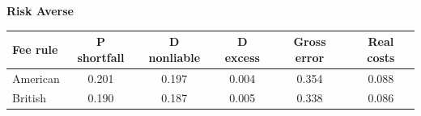\documentclass[10pt,border=5pt,varwidth=17cm]{standalone}
\begin{document}
\begingroup
\small
\setlength{\tabcolsep}{5pt}
\renewcommand{\arraystretch}{1.20}
\noindent\textbf{Risk Averse}\par\smallskip
\noindent\begin{tabularx}{\linewidth}{@{}>{\raggedright\arraybackslash}Xccccc@{}}
\toprule
\textbf{Fee rule} & \textbf{P shortfall} & \textbf{D nonliable} & \textbf{D excess} & \textbf{Gross error} & \textbf{Real costs} \\
\midrule
American & 0.201 & 0.197 & 0.004 & 0.354 & 0.088 \\
British & 0.190 & 0.187 & 0.005 & 0.338 & 0.086 \\
\bottomrule\end{tabularx}\par\medskip
\endgroup
\end{document}

